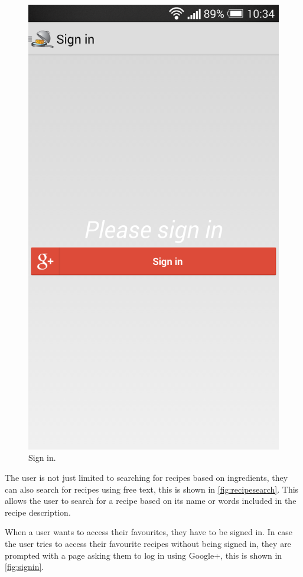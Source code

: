 \begin{figure}[H]
\begin{minipage}[t]{0.5\columnwidth}
\includegraphics[width=0.7\columnwidth]{img/screenshots/finalsignin.png}
\caption{Sign in\label{fig:signin}.}
\end{minipage}
\end{figure}

The user is not just limited to searching for recipes based on ingredients, they can also search for recipes using free text, this is shown in \autoref{fig:recipesearch}. This allows the user to search for a recipe based on its name or words included in the recipe description.

When a user wants to access their favourites, they have to be signed in. In case the user tries to access their favourite recipes without being signed in, they are prompted with a page asking them to log in using Google+, this is shown in \autoref{fig:signin}.


